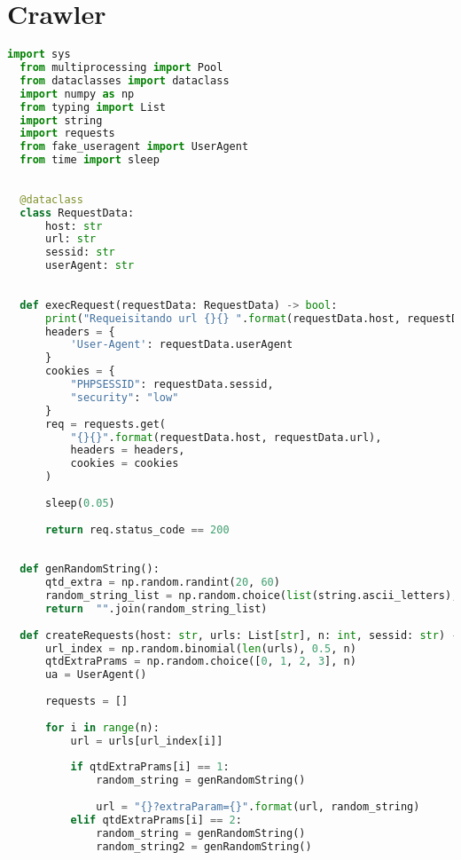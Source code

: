 
\chapter{Crawler}
\label{ap:crawler}


\begin{lstlisting}[language=Python]
  import sys
  from multiprocessing import Pool
  from dataclasses import dataclass
  import numpy as np
  from typing import List
  import string
  import requests
  from fake_useragent import UserAgent
  from time import sleep
  
  
  @dataclass
  class RequestData:
      host: str
      url: str
      sessid: str
      userAgent: str
  
  
  def execRequest(requestData: RequestData) -> bool:
      print("Requeisitando url {}{} ".format(requestData.host, requestData.url))
      headers = {
          'User-Agent': requestData.userAgent
      }
      cookies = {
          "PHPSESSID": requestData.sessid,
          "security": "low"
      }
      req = requests.get(
          "{}{}".format(requestData.host, requestData.url), 
          headers = headers,
          cookies = cookies
      )
      
      sleep(0.05)
  
      return req.status_code == 200
  
  
  def genRandomString():
      qtd_extra = np.random.randint(20, 60)
      random_string_list = np.random.choice(list(string.ascii_letters), qtd_extra)
      return  "".join(random_string_list)
  
  def createRequests(host: str, urls: List[str], n: int, sessid: str) -> List[RequestData]:
      url_index = np.random.binomial(len(urls), 0.5, n)
      qtdExtraPrams = np.random.choice([0, 1, 2, 3], n)
      ua = UserAgent()
  
      requests = []
  
      for i in range(n):
          url = urls[url_index[i]]
  
          if qtdExtraPrams[i] == 1:
              random_string = genRandomString()
  
              url = "{}?extraParam={}".format(url, random_string)
          elif qtdExtraPrams[i] == 2:
              random_string = genRandomString()
              random_string2 = genRandomString()
  

\end{lstlisting}
